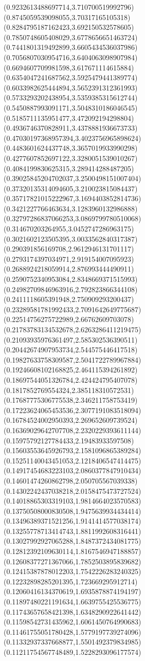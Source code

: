 {(0.9232613488697714,3.710700519992796)
(0.8745059539098055,3.70317165105318)
(0.8284795187162423,3.692150532578605)
(0.7850748605408029,3.6778656651463724)
(0.7441801319492899,3.6605434536037986)
(0.7056807030954716,3.6404063098907984)
(0.6694607709981598,3.617671114615884)
(0.6354047241687562,3.5925479441389774)
(0.6033982625444894,3.5652391312361993)
(0.5733293202438954,3.5359385315612744)
(0.5450887993091171,3.5048310186046545)
(0.5185711135951477,3.472092194298804)
(0.4936746370828911,3.4378881936673733)
(0.47030197368957394,3.4023756965898624)
(0.4483601624437748,3.3657019933990298)
(0.4277607852697122,3.3280051539010267)
(0.4084199830625315,3.289414288487205)
(0.39025845204702037,3.2500498151007404)
(0.37320135314094605,3.210023815084437)
(0.35717821015222967,3.1694403852814736)
(0.3421227766463634,3.1283960132986888)
(0.32797286837066253,3.0869799780510068)
(0.314670203264955,3.0452747286963175)
(0.3021602123505395,3.0033562840317387)
(0.290391856169708,2.9612946131701117)
(0.2793174397034971,2.919154007095923)
(0.2688924218059914,2.876993444490911)
(0.2590752340953084,2.8348669371515993)
(0.24982709846963916,2.792823866344108)
(0.2411118605391948,2.750909293200437)
(0.23289581781992433,2.7091642649775687)
(0.22514756275722989,2.66762609703078)
(0.21783783134532678,2.6263286411219475)
(0.21093935976361497,2.585302536390511)
(0.20442674907953734,2.544575446417518)
(0.19827633758309587,2.5041722789967884)
(0.19246608102168825,2.464115394261892)
(0.18697544051326784,2.424424795407078)
(0.1817852769554324,2.385118310572531)
(0.17687775306775538,2.346211758753419)
(0.17223624065453536,2.3077191083518094)
(0.16784524002950393,2.269652609739524)
(0.16369029642707708,2.2320229393611144)
(0.15975792127784433,2.19483933597508)
(0.15603553645926793,2.1581096865389284)
(0.15251140043451053,2.1218406547414475)
(0.14917454683223103,2.0860377847910434)
(0.14601474260862798,2.050705567039338)
(0.14302242437038218,2.0158475473727524)
(0.14018865303319103,1.9814664023570583)
(0.13750508000830508,1.9475639934434414)
(0.13496389371521256,1.9141414577038174)
(0.13255778713414743,1.8811992608316441)
(0.13027992927065288,1.8487372434081775)
(0.12812392109630114,1.8167546947188857)
(0.12608377271367066,1.7852503895839682)
(0.12415387878012203,1.7542226283240325)
(0.12232898285201395,1.723669295912714)
(0.12060416134370619,1.6935878874194197)
(0.11897480221191634,1.6639755425536775)
(0.11743657658421398,1.6348290922641442)
(0.11598542731435962,1.6061450764990683)
(0.11461755051780428,1.5779197739274096)
(0.11332937337668877,1.5501492379834985)
(0.11211754567748489,1.5228293096177574)
}
